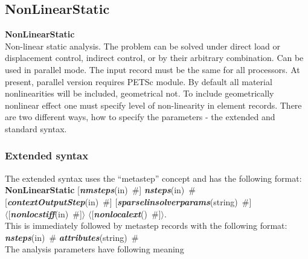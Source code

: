 \documentclass[draft]{article}
\newcommand{\fieldVal}[2]{\mbox{({\it\bf{#1}\#)\tiny (#2)}}}
\newcommand{\keywordnotype}[1]{\mbox{{\it{\bf{#1}}}}}
\newcommand{\keyword}[2]{\mbox{{\keywordnotype{#1}\tiny (#2)}}}
\newcommand{\entKeywordInst}[1]{\mbox{{\bf{{#1}}}}}
\newcommand{\field}[2]{\mbox{\keyword{#1}{#2}~\#}}
\newcommand{\optField}[2]{\mbox{[\field{#1}{#2}]}}
\newcommand{\Pmode}[1]{{\sffamily #1}}
\newcommand{\PoptField}[2]{\mbox{$\langle$[\field{#1}{#2}]$\rangle$}}
\begin{document}
\subsection{NonLinearStatic}
\label{NonLinearStatic}
\entKeywordInst{NonLinearStatic} \\
Non-linear static analysis. The problem can be solved under 
direct load or displacement control, indirect control, or by
their arbitrary combination.
\Pmode{Can be used in parallel mode. The input record must be the same
for all processors. At present, parallel version requires PETSc module.}
By default all
material nonlinearities will be included, geometrical not. 
To include geometrically nonlinear effect one must specify
level of non-linearity in element records.
There are two different ways, how to specify the parameters - the
extended and standard syntax. 
\subsubsection{Extended syntax}
The extended syntax uses the ``metastep'' concept and has the
following format:
\entKeywordInst{NonLinearStatic} \optField{nmsteps}{in} \field{nsteps}{in}\\
\optField{contextOutputStep}{in}
\optField{sparselinsolverparams}{string}\\
\PoptField{nonlocstiff}{in} \PoptField{nonlocalext}{}.\\
This is immediately followed by metastep records with the following format:
\field{nsteps}{in} \field{attributes}{string}\\
The analysis parameters have following meaning
\end{document}

